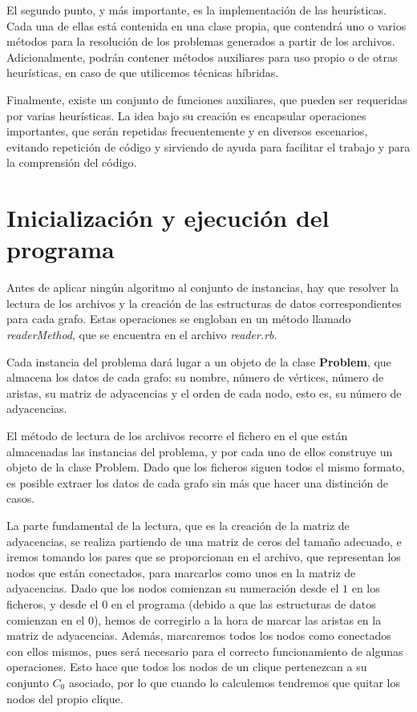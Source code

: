 El segundo punto, y más importante, es la implementación de las heurísticas.
Cada una de ellas está contenida en una clase propia, que contendrá uno o varios
métodos para la resolución de los problemas generados a partir de los archivos.
Adicionalmente, podrán contener métodos auxiliares para uso propio o de otras
heurísticas, en caso de que utilicemos técnicas híbridas.

Finalmente, existe un conjunto de funciones auxiliares, que pueden ser
requeridas por varias heurísticas. La idea bajo su creación es encapsular
operaciones importantes, que serán repetidas frecuentemente y en diversos
escenarios, evitando repetición de código y sirviendo de ayuda para facilitar
el trabajo y para la comprensión del código.


\section{Inicialización y ejecución del programa}

Antes de aplicar ningún algoritmo al conjunto de instancias, hay que resolver la
lectura de los archivos y la creación de las estructuras de datos correspondientes
para cada grafo. Estas operaciones se engloban en un método llamado \textit{readerMethod},
que se encuentra en el archivo \textit{reader.rb}.

Cada instancia del problema dará lugar a un objeto de la clase \textbf{Problem}, que
almacena los datos de cada grafo: su nombre, número de vértices, número de aristas,
su matriz de adyacencias y el orden de cada nodo, esto es, su número de adyacencias.

El método de lectura de los archivos recorre el fichero en el que están almacenadas
las instancias del problema, y por cada uno de ellos construye un objeto de la clase
Problem. Dado que los ficheros siguen todos el mismo formato, es posible extraer
los datos de cada grafo sin más que hacer una distinción de casos.

La parte fundamental de la lectura, que es la creación de la matriz de adyacencias,
se realiza partiendo de una matriz de ceros del tamaño adecuado, e iremos tomando
los pares que se proporcionan en el archivo, que representan los nodos que están
conectados, para marcarlos como unos en la matriz de adyacencias. Dado que los
nodos comienzan su numeración desde el $1$ en los ficheros, y desde el $0$ en el
programa (debido a que las estructuras de datos comienzan en el $0$), hemos de
corregirlo a la hora de marcar las aristas en la matriz de adyacencias. Además,
marcaremos todos los nodos como conectados con ellos mismos, pues será necesario
para el correcto funcionamiento de algunas operaciones. Esto hace que todos los
nodos de un clique pertenezcan a su conjunto $C_0$ asociado, por lo que cuando lo
calculemos tendremos que quitar los nodos del propio clique.

